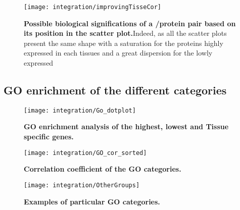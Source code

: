 \begin{figure}[!htbp]
    \texttt{[image: integration/improvingTisseCor]}\centering
    \caption[Possible biological significations of a \mRNA/protein pair based on
    its possition in the scatter plot]
    {\label{fig:CorImprovable}\textbf{Possible biological significations of a
    \mRNA/protein pair based on its position in the scatter plot.}Indeed, as all
    the scatter plots present the same shape with a saturation for the proteins
    highly expressed in each tissues and a great dispersion for the lowly
    expressed \mRNAs}
\end{figure}


\subsection{GO enrichment of the different categories}


\begin{figure}[!htbp]
\texttt{[image: integration/Go\_dotplot]}\centering
    \caption[GO enrichment analysis of the highest, lowest and Tissue
    specific genes]{\label{fig:Go_dotplot}\textbf{GO enrichment analysis of the
    highest, lowest and Tissue specific genes.}}
\end{figure}


\begin{figure}[!htbp]
\texttt{[image: integration/GO\_cor\_sorted]}\centering
    \caption[Correlation coefficient of the pairs for the GO
    categories]{\label{fig:GO_cor_sorted}\textbf{Correlation coefficient of the
    GO categories.}}
\end{figure}


\begin{figure}[!htbp]
\texttt{[image: integration/OtherGroups]}\centering
    \caption[Examples of particular GO
    categories]{\label{fig:GO_sub_groups}\textbf{Examples of particular GO
    categories.}}
\end{figure}





